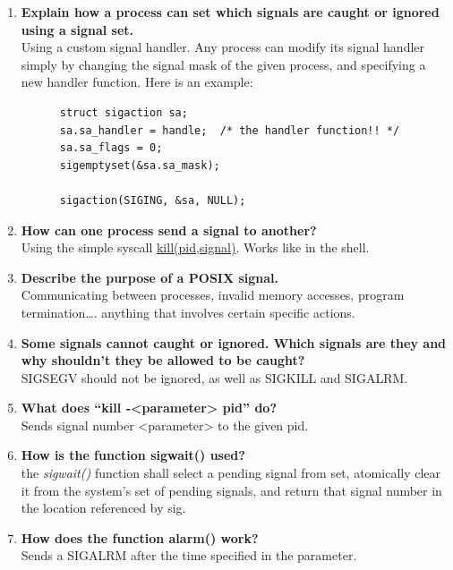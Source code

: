 \documentclass[a4paper]{article}
\begin{document}
\begin{enumerate}
  \item {\bf Explain how a process can set which signals are caught or ignored using a signal set. } \\
    Using a custom signal handler. Any process can modify its signal handler simply by changing the signal mask of the given process, and specifying a new handler function. Here is an example:
    \begin{lstlisting}
      struct sigaction sa;
      sa.sa_handler = handle;  /* the handler function!! */
      sa.sa_flags = 0;
      sigemptyset(&sa.sa_mask);

      sigaction(SIGING, &sa, NULL);
    \end{lstlisting}

  \item {\bf How can one process send a signal to another?} \\
    Using the simple syscall \underline{kill(pid,signal)}. Works like in the shell.

  \item {\bf Describe the purpose of a POSIX signal. } \\
    Communicating between processes, invalid memory accesses, program termination\dots. anything that involves certain specific actions.
  \item {\bf Some signals cannot caught or ignored. Which signals are they and why shouldn’t they be allowed to be caught? }\\
    SIGSEGV should not be ignored, as well as SIGKILL and SIGALRM.

  \item {\bf What does “kill -<parameter> pid” do?} \\
    Sends signal number <parameter> to the given pid.

  \item {\bf How is the function sigwait() used?} \\
    the \emph{sigwait()} function shall select a pending signal from set, atomically clear it from the system's set of pending signals, and return that signal number in the location referenced by sig.

  \item {\bf How does the function alarm() work?} \\
    Sends a SIGALRM after the time specified in the parameter.
\end{enumerate}
\end{document}
